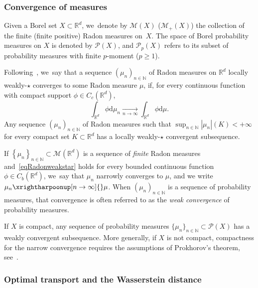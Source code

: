 \documentclass[JEP,XML,SOM,Unicode,NoFloatCountersInSection,published]{cedram}
\theoremstyle{definition}
\newcommand{\RR}{\mathbb{R}}
\newcommand\dd{\mathrm{d}}
\newcommand{\abs}[1]{\left\lvert#1\right\rvert}
\begin{document}
\subsubsection{Convergence of measures}
Given a Borel set $X\subset \RR^d$, we~denote by $\mathcal{M}(X)$ (\resp $\mathcal{M}_+(X)$) the collection of the finite (\resp finite positive) Radon measures on~$X$.
The space of Borel probability measures on $X$ is denoted by $\mathcal{P}(X)$, and $\mathcal{P}_p(X)$ refers to its subset of probability measures with finite $p$-moment ($p\ge 1$).

Following~\cite{ambrosio2000functions}, we~say that a sequence $\left(\mu_n\right)_{n \in \mathbb{N}}$ of Radon measures on $\RR^d$ locally weakly-$\star$ converges to some Radon measure $\mu$, if, for every continuous function with compact support $\phi \in C_c(\RR^d)$,
\begin{equation}\label{eqRadonweakstar}
\int_{\RR^d} \phi \dd \mu_n
\xrightarrow[n \to \infty]{}
\int_{\RR^d} \phi \dd \mu.
\end{equation}
Any sequence $(\mu_n)_{n\in\mathbb{N}}$ of Radon measures such that $\sup_{n\in\mathbb{N}} \abs{\mu_n}(K)<+\infty$ for every compact set $K\subset \RR^d$ has a locally weakly-$\star$ convergent subsequence.

If $\left\{\mu_n\right\}_{n \in \mathbb{N}}\subset \mathcal{M}(\RR^d)$ is a sequence of \emph{finite} Radon measures and~\eqref{eqRadonweakstar} holds for every bounded continuous function $\phi\in C_b(\RR^d)$, we~say that $\mu_n$ narrowly converges to $\mu$, and we write $\mu_n \xrightharpoonup[n \to \infty]{} \mu$. When $(\mu_n)_{n\in\mathbb{N}}$ is a sequence of probability measures, that convergence is often referred to as the \emph{weak convergence} of probability measures.

If $X$ is compact, any sequence of probability measures $\{\mu_n\}_{n\in\mathbb{N}}\subset \mathcal{P}(X)$ has a weakly convergent subsequence.
More generally, if $X$ is not compact, compactness for the narrow convergence requires the assumptions of Prokhorov's theorem,
see~\hbox{\cite[Th.\,2.8]{ambrosio2021lectures}}.

\subsubsection{Optimal transport and the Wasserstein distance}
\label{sec:wasserstein}
\end{document}
